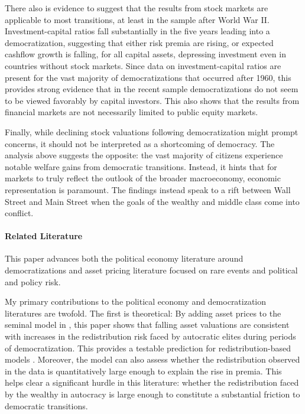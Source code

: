 \label{par:ik_intro_evidence}
There also is evidence to suggest that the results from stock markets are applicable to most transitions, at least in the sample after World War II. Investment-capital ratios fall substantially in the five years leading into a democratization, suggesting that either risk premia are rising, or expected cashflow growth is falling, for all capital assets, depressing investment even in countries without stock markets. Since data on investment-capital ratios are present for the vast majority of democratizations that occurred after 1960, this provides strong evidence that in the recent sample democratizations do not seem to be viewed favorably by capital investors. This also shows that the results from financial markets are not necessarily limited to public equity markets.
\label{par:limitation_acknowledge_end}

Finally, while declining stock valuations following democratization might prompt concerns, it should not be interpreted as a shortcoming of democracy. The analysis above suggests the opposite: the vast majority of citizens experience notable welfare gains from democratic transitions. Instead, it hints that for markets to truly reflect the outlook of the broader macroeconomy, economic representation is paramount. The findings instead speak to a rift between Wall Street and Main Street when the goals of the wealthy and middle class come into conflict.

\paragraph{Related Literature}

This paper advances both the political economy literature around democratizations and asset pricing literature focused on rare events and political and policy risk.

My primary contributions to the political economy and democratization literatures are twofold. The first is theoretical: By adding asset prices to the seminal model in \cite*{Acemoglu2006}, this paper shows that falling asset valuations are consistent with increases in the redistribution risk faced by autocratic elites during periods of democratization. This provides a testable prediction for redistribution-based models \citep*{Boix2003,Acemoglu2006}. Moreover, the model can also assess whether the redistribution observed in the data is quantitatively large enough to explain the rise in premia. This helps clear a significant hurdle in this literature: whether the redistribution faced by the wealthy in autocracy is large enough to constitute a substantial friction to democratic transitions. 

